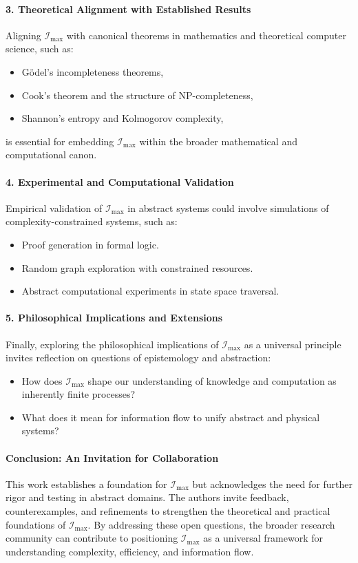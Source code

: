 \documentclass[12pt]{article}
\begin{document}
\paragraph{3. Theoretical Alignment with Established Results}
Aligning \(\mathcal{I}_{\text{max}}\) with canonical theorems in mathematics and theoretical computer science, such as:
\begin{itemize}
    \item Gödel’s incompleteness theorems,
    \item Cook’s theorem and the structure of NP-completeness,
    \item Shannon’s entropy and Kolmogorov complexity,
\end{itemize}
is essential for embedding \(\mathcal{I}_{\text{max}}\) within the broader mathematical and computational canon.

\paragraph{4. Experimental and Computational Validation}
Empirical validation of \(\mathcal{I}_{\text{max}}\) in abstract systems could involve simulations of complexity-constrained systems, such as:
\begin{itemize}
    \item Proof generation in formal logic.
    \item Random graph exploration with constrained resources.
    \item Abstract computational experiments in state space traversal.
\end{itemize}

\paragraph{5. Philosophical Implications and Extensions}
Finally, exploring the philosophical implications of \(\mathcal{I}_{\text{max}}\) as a universal principle invites reflection on questions of epistemology and abstraction:
\begin{itemize}
    \item How does \(\mathcal{I}_{\text{max}}\) shape our understanding of knowledge and computation as inherently finite processes?
    \item What does it mean for information flow to unify abstract and physical systems?
\end{itemize}

\paragraph{Conclusion: An Invitation for Collaboration}
This work establishes a foundation for \(\mathcal{I}_{\text{max}}\) but acknowledges the need for further rigor and testing in abstract domains. The authors invite feedback, counterexamples, and refinements to strengthen the theoretical and practical foundations of \(\mathcal{I}_{\text{max}}\). By addressing these open questions, the broader research community can contribute to positioning \(\mathcal{I}_{\text{max}}\) as a universal framework for understanding complexity, efficiency, and information flow.
\end{document}
